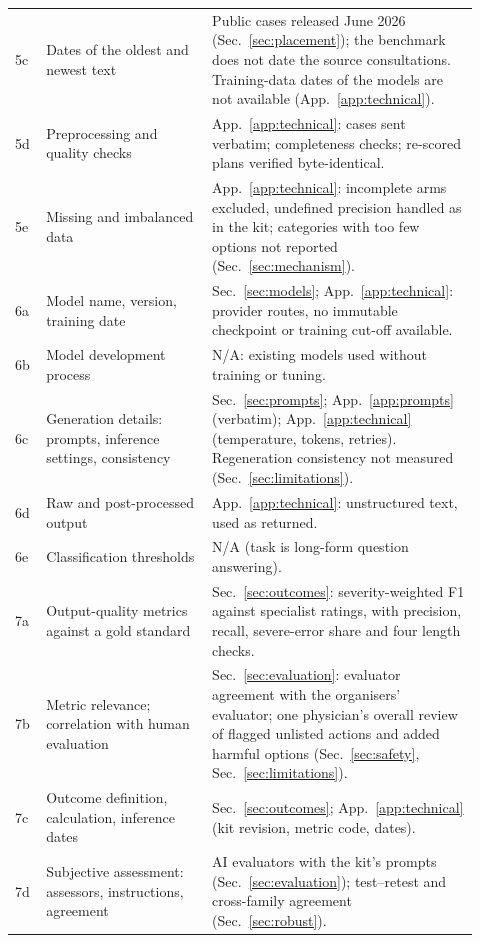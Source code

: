 \documentclass[11pt]{article}
\begin{document}
{\begin{longtable}{>{\raggedright\arraybackslash}p{0.06\linewidth}
  >{\raggedright\arraybackslash}p{0.33\linewidth}
  >{\raggedright\arraybackslash}p{0.53\linewidth}}
5c & Dates of the oldest and newest text & Public cases released June 2026
  (Sec.~\ref{sec:placement}); the benchmark does not date the source consultations. Training-data
  dates of the models are not available (App.~\ref{app:technical}).\\
5d & Preprocessing and quality checks & App.~\ref{app:technical}: cases sent verbatim; completeness
  checks; re-scored plans verified byte-identical.\\
5e & Missing and imbalanced data & App.~\ref{app:technical}: incomplete arms excluded, undefined
  precision handled as in the kit; categories with too few options not reported
  (Sec.~\ref{sec:mechanism}).\\
6a & Model name, version, training date & Sec.~\ref{sec:models}; App.~\ref{app:technical}: provider
  routes, no immutable checkpoint or training cut-off available.\\
6b & Model development process & N/A: existing models used without training or tuning.\\
6c & Generation details: prompts, inference settings, consistency & Sec.~\ref{sec:prompts};
  App.~\ref{app:prompts} (verbatim); App.~\ref{app:technical} (temperature, tokens, retries).
  Regeneration consistency not measured (Sec.~\ref{sec:limitations}).\\
6d & Raw and post-processed output & App.~\ref{app:technical}: unstructured text, used as returned.\\
6e & Classification thresholds & N/A (task is long-form question answering).\\
7a & Output-quality metrics against a gold standard & Sec.~\ref{sec:outcomes}: severity-weighted F1
  against specialist ratings, with precision, recall, severe-error share and four length checks.\\
7b & Metric relevance; correlation with human evaluation & Sec.~\ref{sec:evaluation}: evaluator
  agreement with the organisers' evaluator; one physician's overall review of flagged unlisted
  actions and added harmful options (Sec.~\ref{sec:safety}, Sec.~\ref{sec:limitations}).\\
7c & Outcome definition, calculation, inference dates & Sec.~\ref{sec:outcomes};
  App.~\ref{app:technical} (kit revision, metric code, dates).\\
7d & Subjective assessment: assessors, instructions, agreement & AI evaluators with the kit's
  prompts (Sec.~\ref{sec:evaluation}); test--retest and cross-family agreement
  (Sec.~\ref{sec:robust}).\\

\end{longtable}}
\end{document}

